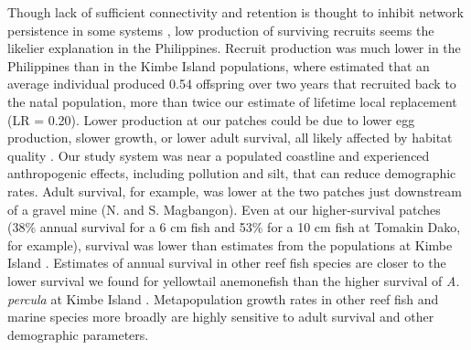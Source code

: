 \documentclass[12pt, oneside]{article}   	%
\begin{document}
Though lack of sufficient connectivity and retention is thought to inhibit network persistence in some systems \citep[e.g., insufficient retention of offspring within reserves for eastern oysters (\textit{Crassostrea virginica}) in North Carolina;][]{puckett2016metapopulation}, low production of surviving recruits seems the likelier explanation in the Philippines. Recruit production was much lower in the Philippines than in the Kimbe Island populations, where \cite{salles2020strong} estimated that an average individual produced 0.54 offspring over two years that recruited back to the natal population, more than twice our estimate of lifetime local replacement (LR = 0.20). Lower production at our patches could be due to lower egg production, slower growth, or lower adult survival, all likely affected by habitat quality \citep[e.g.][]{salles2020strong, hayashi2019low}. Our study system was near a populated coastline and experienced anthropogenic effects, including pollution and silt, that can reduce demographic rates. Adult survival, for example, was lower at the two patches just downstream of a gravel mine (N. and S. Magbangon). Even at our higher-survival patches (38\% annual survival for a 6 cm fish and 53\% for a 10 cm fish at Tomakin Dako, for example), survival was lower than estimates from the populations at Kimbe Island \citep[85\% annual survival,][]{salles_coral_2015}. Estimates of annual survival in other reef fish species are closer to the lower survival we found for yellowtail anemonefish than the higher survival of \textit{A. percula} at Kimbe Island \citep[approximately 30\% annual survival for bluehead wrasse (\textit{Thalassoma bifasciatum}) and bicolour damselfish (\textit{Stegastes partitus}), respectively;][]{warner1988population, figueira2008small}. Metapopulation growth rates in other reef fish \citep[e.g.,][]{figueira2009connectivity} and marine species more broadly \citep{carson2011evaluating} are highly sensitive to adult survival and other demographic parameters.

\end{document}
